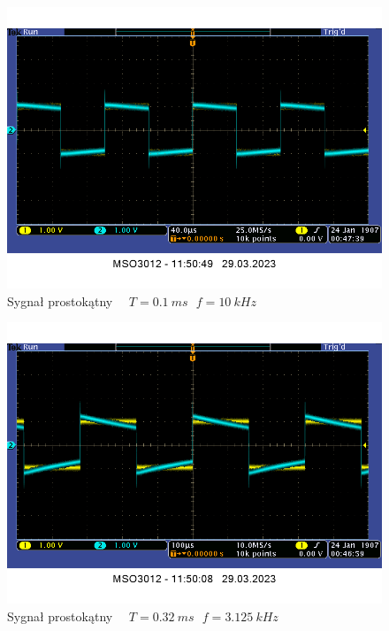 \documentclass[14pt, table]{extarticle}
\begin{document}
\begin{figure}[H]
\includegraphics[scale=0.65]{CR-square-0_1ms}
\centering
\captionsetup{labelformat=empty}
\caption{Sygnał prostokątny \ \ $T = 0.1 \ ms \ \ \ f = 10 \ kHz$}
\end{figure}

\begin{figure}[H]
\includegraphics[scale=0.65]{CR-square-0_32ms}
\centering
\captionsetup{labelformat=empty}
\caption{Sygnał prostokątny \ \ $T = 0.32 \ ms \ \ \ f = 3.125 \ kHz$}
\end{figure}
\end{document}
